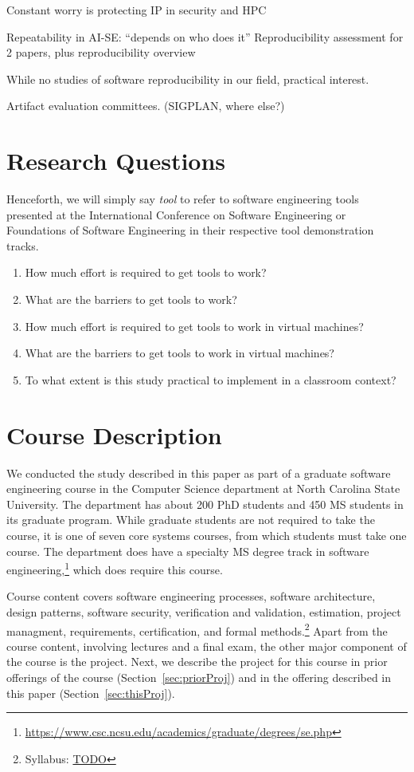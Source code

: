 \documentclass{sig-alternate-05-2015}
\begin{document}
Constant worry is protecting IP in security and HPC

Repeatability in AI-SE: ``depends on who does it''
Reproducibility assessment for 2 papers, plus reproducibility overview~\cite{gonzalez2012reproducibility}


While no studies of software reproducibility in our field,
practical interest.

Artifact evaluation committees. (SIGPLAN, where else?)


\section{Research Questions}

Henceforth, we will simply say \textit{tool}
to refer to software engineering tools presented at
the International Conference on Software Engineering
or Foundations of Software Engineering in their
respective tool demonstration tracks.

\begin{enumerate}
  \item How much effort is required to get tools to work?
  \item What are the barriers to get tools to work?
  \item How much effort is required to get tools to work in virtual machines?
  \item What are the barriers to get tools to work in virtual machines?
  \item To what extent is this study practical to implement in a classroom context?
\end{enumerate}

\section{Course Description}

We conducted the study described in this paper as 
part of a graduate software engineering course
in the Computer Science department at 
North Carolina State University.
The department has about 200 PhD students and 450
MS students in its graduate program.
While graduate students are not required to
take the course, it is one of seven core systems
courses, from which students must take one course.
The department does have a specialty MS degree
track in software 
engineering,\footnote{\url{https://www.csc.ncsu.edu/academics/graduate/degrees/se.php}}
which does require this course.

Course content covers software engineering processes,
software architecture, design patterns, software security,
verification and validation, estimation, project managment,
requirements, certification, and formal 
methods.\footnote{Syllabus: \url{TODO}}
Apart from the course content, involving lectures and
a final exam, the other
major component of the course is the project.
Next, we describe the project for this course 
in prior offerings of the course (Section~\ref{sec:priorProj})
and in the offering described in this paper (Section~\ref{sec:thisProj}).
\end{document}

